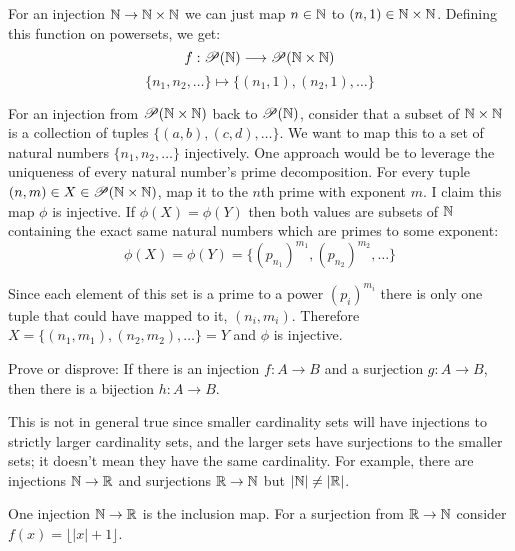 \documentclass{article}
\begin{document}
For an injection $\mathbb{N} \to \mathbb{N} \times \mathbb{N}$ we can just map $n \in \mathbb{N}$ to $(n, 1) \in \mathbb{N} \times \mathbb{N}$. Defining this function on powersets, we get:
$$f: \mathscr{P}(\mathbb{N}) \longrightarrow \mathscr{P}(\mathbb{N} \times \mathbb{N})$$
$$\{n_1, n_2, \ldots\} \longmapsto \{(n_1, 1), (n_2, 1), \ldots\}$$

For an injection from $\mathscr{P}(\mathbb{N} \times \mathbb{N})$ back to $\mathscr{P}(\mathbb{N})$, consider that a subset of $\mathbb{N} \times \mathbb{N}$ is a collection of tuples $\{(a, b), (c, d), \ldots\}$. We want to map this to a set of natural numbers $\{n_1, n_2, \ldots\}$ injectively. One approach would be to leverage the uniqueness of every natural number's prime decomposition. For every tuple $(n, m) \in X \in \mathscr{P}(\mathbb{N} \times \mathbb{N})$, map it to the $n$th prime with exponent $m$. I claim this map $\phi$ is injective. If $\phi(X) = \phi(Y)$ then both values are subsets of $\mathbb{N}$ containing the exact same natural numbers which are primes to some exponent:
$$\phi(X) = \phi(Y) = \{(p_{n_1})^{m_1}, (p_{n_2})^{m_2}, \ldots\}$$

Since each element of this set is a prime to a power $(p_i)^{m_i}$ there is only one tuple that could have mapped to it, $(n_i, m_i)$. Therefore $X = \{(n_1, m_1), (n_2, m_2), \ldots\} = Y$ and $\phi$ is injective.

\begin{problem}
Prove or disprove: If there is an injection $f: A \to B$ and a surjection $g: A \to B$, then there is a bijection $h: A \to B$.
\end{problem}

This is not in general true since smaller cardinality sets will have injections to strictly larger cardinality sets, and the larger sets have surjections to the smaller sets; it doesn't mean they have the same cardinality. For example, there are injections $\mathbb{N} \to \mathbb{R}$ and surjections $\mathbb{R} \to \mathbb{N}$ but $|\mathbb{N}| \neq |\mathbb{R}|$.

One injection $\mathbb{N} \to \mathbb{R}$ is the inclusion map. For a surjection from $\mathbb{R} \to \mathbb{N}$ consider $f(x) = \lfloor|x| + 1\rfloor$.
\end{document}
